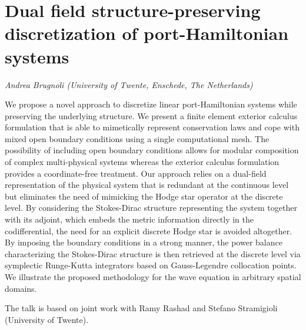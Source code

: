 \documentclass{article}
\begin{document}
\newcommand*{\hh}{\mathcal{H}}
\section*{Dual field structure-preserving discretization of port-Hamiltonian systems}


 {\sl Andrea Brugnoli (University of Twente, Enschede, The Netherlands)}

\medskip
 \noindent
 
 We propose a novel approach to discretize linear port-Hamiltonian systems while preserving the underlying structure. We present a finite element exterior calculus formulation that is able to mimetically represent conservation laws and cope with mixed open boundary conditions using a single computational mesh.
 The possibility of including open boundary conditions allows for modular composition of complex multi-physical systems whereas the exterior calculus formulation provides a coordinate-free treatment.
 Our approach relies on a dual-field representation of the physical system that is redundant at the continuous level but eliminates the need of mimicking the Hodge star operator at the discrete level.
 By considering the Stokes-Dirac structure representing the system together with its adjoint, which  embeds the metric information directly in the codifferential, the need for an explicit discrete Hodge star is avoided altogether.
 By imposing the boundary conditions in a strong manner, the power balance characterizing the Stokes-Dirac structure is then retrieved at the discrete level via symplectic Runge-Kutta integrators based on Gauss-Legendre collocation points. We illustrate the proposed methodology for the wave equation in arbitrary spatial domains.



The talk is based on joint work with Ramy Rashad and Stefano Stramigioli (University of Twente).
\end{document}
